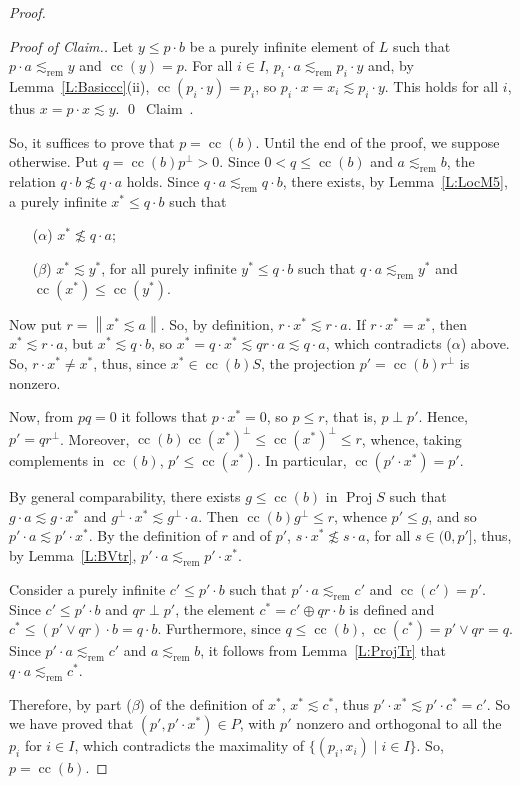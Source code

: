 \documentclass[psamsfonts,reqno]{memo-l}
\theoremstyle{plain}
\theoremstyle{definition}
\theoremstyle{remark}
\newcommand{\qedc}{{\qed}~{\rm Claim~{\theclaim}.}}
\newenvironment{cproof}
{\begin{proof}[Proof of Claim.]}
{\qedc\renewcommand{\qed}{}\end{proof}}
\numberwithin{equation}{section}
\newcommand{\srem}{\lesssim_{\mathrm{rem}}}
\newcommand{\bv}[1]{\left\|#1\right\|}
\DeclareMathOperator{\cc}{cc}
\DeclareMathOperator{\BB}{Proj}
\newcommand{\set}[1]{\{#1\}}
\newcommand{\setm}[2]{\set{#1\mid#2}}
\begin{document}
\begin{proof}
\begin{cproof}
Let $y\leq p\cdot b$ be a purely infinite element of $L$ such that
$p\cdot a\srem y$ and $\cc(y)=p$. For all $i\in I$,
$p_i\cdot a\srem p_i\cdot y$ and, by Lemma~\ref{L:Basiccc}(ii),
$\cc(p_i\cdot y)=p_i$, so $p_i\cdot x=x_i\lesssim p_i\cdot y$. This holds
for all $i$, thus $x=p\cdot x\lesssim y$.
\end{cproof}

So, it suffices to prove that $p=\cc(b)$. Until the end of the proof, we
suppose otherwise. Put $q=\cc(b)p^\bot>0$. Since $0<q\leq\cc(b)$ and
$a\srem b$, the relation $q\cdot b\not\lesssim q\cdot a$ holds. Since
$q\cdot a\srem q\cdot b$, there exists, by Lemma~\ref{L:LocM5}, a purely
infinite $x^*\leq q\cdot b$ such that
\begin{itemize}
\item[($\alpha$)] $x^*\not\lesssim q\cdot a$;

\item[($\beta$)] $x^*\lesssim y^*$, for all purely infinite
$y^*\leq q\cdot b$ such that
$q\cdot a\srem y^*$ and $\cc(x^*)\leq\cc(y^*)$.
\end{itemize}

Now put $r=\bv{x^*\lesssim a}$. So, by definition,
$r\cdot x^*\lesssim r\cdot a$. If $r\cdot x^*=x^*$, then
$x^*\lesssim r\cdot a$, but $x^*\lesssim q\cdot b$, so
$x^*=q\cdot x^*\lesssim qr\cdot a\lesssim q\cdot a$, which contradicts
($\alpha$) above. So, $r\cdot x^*\neq x^*$, thus, since $x^*\in\cc(b)S$,
the projection $p'=\cc(b)r^\bot$ is nonzero.

Now, from $pq=0$ it follows that $p\cdot x^*=0$, so $p\leq r$, that is,
$p\perp p'$. Hence, $p'=qr^\bot$. Moreover,
$\cc(b)\cc(x^*)^\bot\leq\cc(x^*)^\bot\leq r$, whence, taking complements in
$\cc(b)$, $p'\leq\cc(x^*)$. In particular,
$\cc(p'\cdot x^*)=p'$.

By general comparability, there exists $g\leq\cc(b)$ in
$\BB{S}$\index{pzzroj@$\BB{S}$} such that
$g\cdot a\lesssim g\cdot x^*$ and $g^\bot\cdot x^*\lesssim g^\bot\cdot a$.
Then $\cc(b)g^\bot\leq r$, whence $p'\leq g$, and so
$p'\cdot a\lesssim p'\cdot x^*$.
By the definition of $r$ and of $p'$, $s\cdot x^*\not\lesssim s\cdot a$, for
all $s\in(0,p']$, thus, by Lemma~\ref{L:BVtr}, $p'\cdot a\srem p'\cdot x^*$.

Consider a purely infinite $c'\leq p'\cdot b$ such that $p'\cdot a\srem c'$
and $\cc(c')=p'$. Since $c'\leq p'\cdot b$ and $qr\perp p'$, the element
$c^*=c'\oplus qr\cdot b$ is defined and
$c^*\leq(p'\vee qr)\cdot b=q\cdot b$. Furthermore, since $q\leq\cc(b)$,
$\cc(c^*)=p'\vee qr=q$.
Since $p'\cdot a\srem c'$ and $a\srem b$, it follows from
Lemma~\ref{L:ProjTr} that $q\cdot a\srem c^*$.

Therefore, by part ($\beta$) of the definition of $x^*$, $x^*\lesssim c^*$,
thus $p'\cdot x^*\lesssim p'\cdot c^*=c'$. So we have proved that
$(p',p'\cdot x^*)\in P$, with $p'$ nonzero and orthogonal to all the
$p_i$ for $i\in I$, which contradicts the maximality of
$\setm{(p_i,x_i)}{i\in I}$. So, $p=\cc(b)$.
\end{proof}
\end{document}
